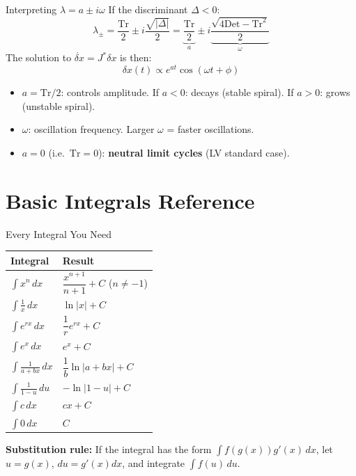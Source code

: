 \documentclass[10pt]{article}
\begin{document}
\begin{rulebox}{Interpreting $\lambda = a \pm i\omega$}
If the discriminant $\Delta < 0$:
\[
\lambda_\pm = \frac{\text{Tr}}{2} \pm i\frac{\sqrt{|{\Delta}|}}{2} = \underbrace{\frac{\text{Tr}}{2}}_{a} \pm i\underbrace{\frac{\sqrt{4\text{Det}-\text{Tr}^2}}{2}}_{\omega}
\]
The solution to $\dot{\delta x} = J^*\delta x$ is then:
\[
\delta x(t) \propto e^{at}\cos(\omega t + \phi)
\]
\begin{itemize}
  \item $a = \text{Tr}/2$: controls amplitude. If $a < 0$: decays (stable spiral). If $a > 0$: grows (unstable spiral).
  \item $\omega$: oscillation frequency. Larger $\omega$ = faster oscillations.
  \item $a = 0$ (i.e.\ $\text{Tr} = 0$): \textbf{neutral limit cycles} (LV standard case).
\end{itemize}
\end{rulebox}

\section{Basic Integrals Reference}

\begin{rulebox}{Every Integral You Need}
\renewcommand{\arraystretch}{1.5}
\begin{tabular}{ll}
\toprule
\textbf{Integral} & \textbf{Result}\\
\midrule
$\displaystyle\int x^n\,dx$ & $\dfrac{x^{n+1}}{n+1} + C$ \quad ($n \neq -1$)\\
$\displaystyle\int \frac{1}{x}\,dx$ & $\ln|x| + C$\\
$\displaystyle\int e^{rx}\,dx$ & $\dfrac{1}{r}e^{rx} + C$\\
$\displaystyle\int e^x\,dx$ & $e^x + C$\\
$\displaystyle\int \frac{1}{a + bx}\,dx$ & $\dfrac{1}{b}\ln|a+bx| + C$\\
$\displaystyle\int \frac{1}{1-u}\,du$ & $-\ln|1-u| + C$\\
$\displaystyle\int c\,dx$ & $cx + C$\\
$\displaystyle\int 0\,dx$ & $C$\\
\bottomrule
\end{tabular}

\medskip
\textbf{Substitution rule:} If the integral has the form $\int f(g(x))g'(x)\,dx$, let $u = g(x)$, $du = g'(x)dx$, and integrate $\int f(u)\,du$.
\end{rulebox}
\end{document}
